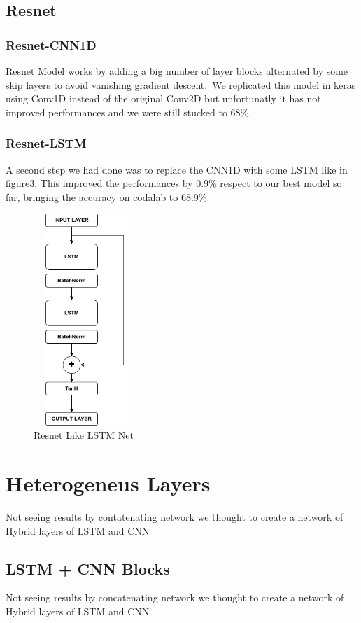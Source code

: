 \documentclass[11pt]{article}
\begin{document}
\subsection{Resnet}
\subsubsection{Resnet-CNN1D}
Resnet Model works by adding a big number of layer blocks alternated by some skip layers to avoid vanishing gradient descent.\
We replicated this model in keras using Conv1D instead of the original Conv2D but unfortunatly it has not improved performances and we were still stucked to 68\%.
\subsubsection{Resnet-LSTM}
A second step we had done was to replace the CNN1D with some LSTM like in figure3,
This improved the performances by 0.9\% respect to our best model so far, bringing the accuracy on codalab to 68.9\%.
\begin{figure}[h]
\centering
\includegraphics[width=4cm, height=8cm,angle =90]{resnet}
\caption{Resnet Like LSTM Net}
\end{figure}

\section{Heterogeneus Layers}
Not seeing results by contatenating network we thought to create a network of Hybrid layers of LSTM and CNN
\subsection{LSTM + CNN Blocks}
Not seeing results by concatenating network we thought to create a network of Hybrid layers of LSTM and CNN
\end{document}
